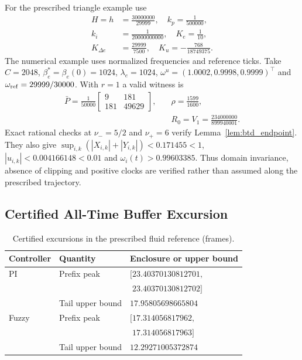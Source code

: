 For the prescribed triangle example use
\begin{align}
 H=h&=\frac{30000000}{29999},\quad k_p=\frac1{500000},\nonumber\\
 k_i&=\frac1{20000000000},\quad K_e=\frac1{10},\nonumber\\
 K_{\Delta e}&=\frac{29999}{7500},\quad K_u=-\frac{768}{18749375}.
 \label{eq:btd_example_gains}
\end{align}
The numerical example uses normalized frequencies and reference ticks. Take $C=2048$, $\beta_e^*=\beta_e(0)=1024$,
$\lambda_e=1024$, $\omega^u=(1.0002,0.9998,0.9999)^\top$ and
$\omega_{\rm ref}=29999/30000$. With $r=1$ a valid witness is
\begin{align}
 \bar P=\frac1{50000}\begin{bmatrix}9&181\\181&49629\end{bmatrix},
 \quad&\rho=\frac{1599}{1600},\nonumber\\
 &
 R_0=V_1=\frac{234000000}{899940001}.
 \label{eq:btd_witness}
\end{align}
Exact rational checks at $\nu_-=5/2$ and $\nu_+=6$ verify
Lemma~\ref{lem:btd_endpoint}. They also give
$\sup_{i,k}(|X_{i,k}|+|Y_{i,k}|)<0.171455<1$,
$|u_{i,k}|<0.004166148<0.01$ and $\omega_i(t)>0.99603385$.
Thus domain invariance, absence of clipping and positive clocks are
verified rather than assumed along the prescribed trajectory.

\subsection{Certified All-Time Buffer Excursion}
\label{subsec:btd_comparative}

\begin{table}[t]
\caption{Certified excursions in the prescribed fluid reference (frames).}
\label{tab:btd_prefix_tail}
\centering
\begin{tabular}{@{}lll@{}}
\toprule
Controller & Quantity & Enclosure or upper bound\\
\midrule
PI & Prefix peak & $[23.40370130812701,$\\
   &             & $\phantom{[}23.40370130812702]$\\
   & Tail upper bound & $17.95805698665804$\\
Fuzzy & Prefix peak & $[17.314056817962,$\\
      &             & $\phantom{[}17.314056817963]$\\
      & Tail upper bound & $12.29271005372874$\\
\bottomrule
\end{tabular}
\end{table}


